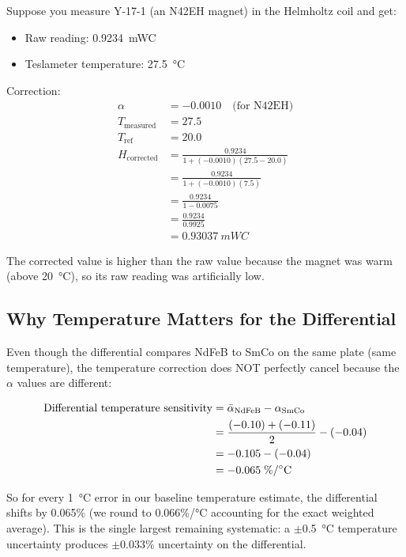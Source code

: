 \documentclass[11pt,letterpaper]{article}
\begin{document}
Suppose you measure Y-17-1 (an N42EH magnet) in the Helmholtz coil and get:
\begin{itemize}[nosep]
  \item Raw reading: \SI{0.9234}{mWC}
  \item Teslameter temperature: \SI{27.5}{\degreeCelsius}
\end{itemize}

Correction:
\begin{align*}
\alpha &= -0.0010 \quad \text{(for N42EH)} \\
T_{\mathrm{measured}} &= 27.5 \\
T_{\mathrm{ref}} &= 20.0 \\[6pt]
H_{\mathrm{corrected}} &= \frac{0.9234}{1 + (-0.0010)(27.5 - 20.0)} \\
  &= \frac{0.9234}{1 + (-0.0010)(7.5)} \\
  &= \frac{0.9234}{1 - 0.0075} \\
  &= \frac{0.9234}{0.9925} \\
  &= \SI{0.93037}{mWC}
\end{align*}

The corrected value is higher than the raw value because the magnet was warm
(above \SI{20}{\degreeCelsius}), so its raw reading was artificially low.

\subsection{Why Temperature Matters for the Differential}

Even though the differential compares NdFeB to SmCo on the same plate (same
temperature), the temperature correction does NOT perfectly cancel because the
$\alpha$ values are different:

\begin{align*}
\text{Differential temperature sensitivity}
  &= \bar{\alpha}_{\mathrm{NdFeB}} - \alpha_{\mathrm{SmCo}} \\
  &= \frac{(-0.10) + (-0.11)}{2} - (-0.04) \\
  &= -0.105 - (-0.04) \\
  &= -0.065\;\text{\%/\si{\degreeCelsius}}
\end{align*}

So for every \SI{1}{\degreeCelsius} error in our baseline temperature estimate,
the differential shifts by 0.065\% (we round to 0.066\%/\si{\degreeCelsius}
accounting for the exact weighted average). This is the single largest remaining
systematic: a $\pm$\SI{0.5}{\degreeCelsius} temperature uncertainty produces
$\pm 0.033\%$ uncertainty on the differential.
\end{document}
